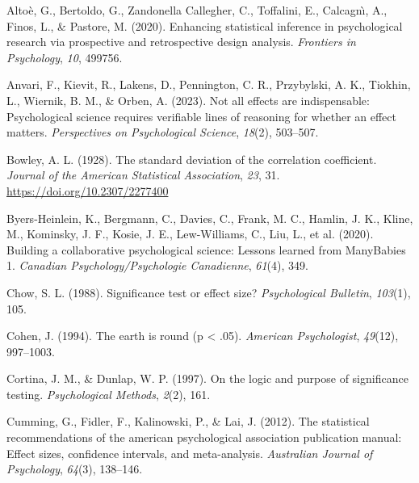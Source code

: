 \documentclass[
  man,floatsintext]{apa7}
\newlength{\cslhangindent}
\newlength{\cslentryspacingunit} %
\newenvironment{CSLReferences}[2] %
 {%
  \setlength{\parindent}{0pt}
  \ifodd #1
  \let\oldpar\par
  \def\par{\hangindent=\cslhangindent\oldpar}
  \fi
  \setlength{\parskip}{#2\cslentryspacingunit}
 }%
 {}
\begin{document}
\hypertarget{refs}{}
\begin{CSLReferences}{1}{0}
\leavevmode{}%
Altoè, G., Bertoldo, G., Zandonella Callegher, C., Toffalini, E., Calcagnı̀, A., Finos, L., \& Pastore, M. (2020). Enhancing statistical inference in psychological research via prospective and retrospective design analysis. \emph{Frontiers in Psychology}, \emph{10}, 499756.

\leavevmode{}%
Anvari, F., Kievit, R., Lakens, D., Pennington, C. R., Przybylski, A. K., Tiokhin, L., Wiernik, B. M., \& Orben, A. (2023). Not all effects are indispensable: Psychological science requires verifiable lines of reasoning for whether an effect matters. \emph{Perspectives on Psychological Science}, \emph{18}(2), 503--507.

\leavevmode{}%
Bowley, A. L. (1928). The standard deviation of the correlation coefficient. \emph{Journal of the American Statistical Association}, \emph{23}, 31. \url{https://doi.org/10.2307/2277400}

\leavevmode{}%
Byers-Heinlein, K., Bergmann, C., Davies, C., Frank, M. C., Hamlin, J. K., Kline, M., Kominsky, J. F., Kosie, J. E., Lew-Williams, C., Liu, L., et al. (2020). Building a collaborative psychological science: Lessons learned from ManyBabies 1. \emph{Canadian Psychology/Psychologie Canadienne}, \emph{61}(4), 349.

\leavevmode{}%
Chow, S. L. (1988). Significance test or effect size? \emph{Psychological Bulletin}, \emph{103}(1), 105.

\leavevmode{}%
Cohen, J. (1994). The earth is round (p \textless{} .05). \emph{American Psychologist}, \emph{49}(12), 997--1003.

\leavevmode{}%
Cortina, J. M., \& Dunlap, W. P. (1997). On the logic and purpose of significance testing. \emph{Psychological Methods}, \emph{2}(2), 161.

\leavevmode{}%
Cumming, G., Fidler, F., Kalinowski, P., \& Lai, J. (2012). The statistical recommendations of the american psychological association publication manual: Effect sizes, confidence intervals, and meta-analysis. \emph{Australian Journal of Psychology}, \emph{64}(3), 138--146.


\end{CSLReferences}
\end{document}
